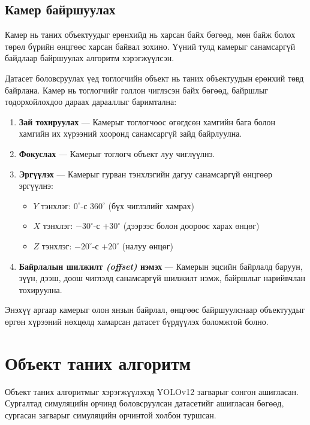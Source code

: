 \subsection{Камер байршуулах}

Камер нь таних объектуудыг ерөнхийд нь харсан байх бөгөөд, мөн байж болох төрөл бүрийн өнцгөөс харсан байвал зохино. Үүний тулд камерыг санамсаргүй байдлаар байршуулах алгоритм хэрэгжүүлсэн.

Датасет боловсруулах үед тоглогчийн объект нь таних объектуудын ерөнхий төвд байрлана. Камер нь тоглогчийг голлон чиглэсэн байх бөгөөд, байршлыг тодорхойлохдоо дараах дарааллыг баримтална:

\begin{enumerate}
    \item \textbf{Зай тохируулах} --- Камерыг тоглогчоос өгөгдсөн хамгийн бага болон хамгийн их хүрээний хооронд санамсаргүй зайд байрлуулна.
    \item \textbf{Фокуслах} --- Камерыг тоглогч объект луу чиглүүлнэ.
    \item \textbf{Эргүүлэх} --- Камерыг гурван тэнхлэгийн дагуу санамсаргүй өнцгөөр эргүүлнэ:
    \begin{itemize}
        \item $Y$ тэнхлэг: $0^\circ$-с $360^\circ$ (бүх чиглэлийг хамрах)
        \item $X$ тэнхлэг: $-30^\circ$-с $+30^\circ$ (дээрээс болон доороос харах өнцөг)
        \item $Z$ тэнхлэг: $-20^\circ$-с $+20^\circ$ (налуу өнцөг)
    \end{itemize}
    \item \textbf{Байрлалын шилжилт \textit{(offset)} нэмэх} --- Камерын эцсийн байрлалд баруун, зүүн, дээш, доош чиглэлд санамсаргүй шилжилт нэмж, байршлыг нарийвчлан тохируулна.
\end{enumerate}

Энэхүү аргаар камерыг олон янзын байрлал, өнцгөөс байршуулснаар объектуудыг өргөн хүрээний нөхцөлд хамарсан датасет бүрдүүлэх боломжтой болно.

\section{Объект таних алгоритм}

Объект таних алгоритмыг хэрэгжүүлэхэд YOLOv12 загварыг сонгон ашигласан. Сургалтад симуляцийн орчинд боловсруулсан датасетийг ашигласан бөгөөд, сургасан загварыг симуляцийн орчинтой холбон туршсан.

